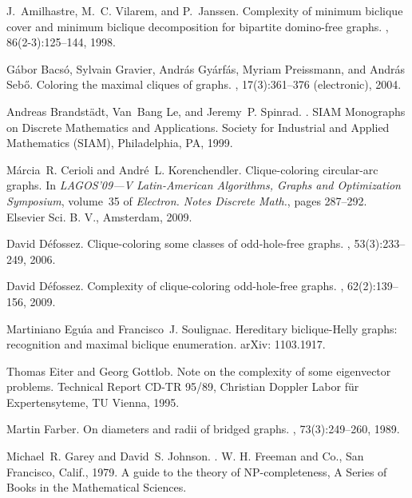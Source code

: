 \documentclass[a4paper, 11pt, oneside]{article}
\begin{document}
\begin{thebibliography}{10}

J.~Amilhastre, M.~C. Vilarem, and P.~Janssen.
\newblock Complexity of minimum biclique cover and minimum biclique
  decomposition for bipartite domino-free graphs.
, 86(2-3):125--144, 1998.

G{\'a}bor Bacs{\'o}, Sylvain Gravier, Andr{\'a}s Gy{\'a}rf{\'a}s, Myriam
  Preissmann, and Andr{\'a}s Seb{\H{o}}.
\newblock Coloring the maximal cliques of graphs.
, 17(3):361--376 (electronic), 2004.

Andreas Brandst{\"a}dt, Van~Bang Le, and Jeremy~P. Spinrad.
.
\newblock SIAM Monographs on Discrete Mathematics and Applications. Society for
  Industrial and Applied Mathematics (SIAM), Philadelphia, PA, 1999.

M{\'a}rcia~R. Cerioli and Andr{\'e}~L. Korenchendler.
\newblock Clique-coloring circular-arc graphs.
\newblock In {\em L{AGOS}'09---{V} {L}atin-{A}merican {A}lgorithms, {G}raphs
  and {O}ptimization {S}ymposium}, volume~35 of {\em Electron. Notes Discrete
  Math.}, pages 287--292. Elsevier Sci. B. V., Amsterdam, 2009.

David D{\'e}fossez.
\newblock Clique-coloring some classes of odd-hole-free graphs.
, 53(3):233--249, 2006.

David D{\'e}fossez.
\newblock Complexity of clique-coloring odd-hole-free graphs.
, 62(2):139--156, 2009.

Martiniano Egu\'{\i}a and Francisco~J. Soulignac.
\newblock Hereditary biclique-{H}elly graphs: recognition and maximal biclique
  enumeration.
\newblock arXiv: 1103.1917.

Thomas Eiter and Georg Gottlob.
\newblock Note on the complexity of some eigenvector problems.
\newblock Technical Report CD-TR 95/89, Christian Doppler Labor f\"ur
  Expertensyteme, TU Vienna, 1995.

Martin Farber.
\newblock On diameters and radii of bridged graphs.
, 73(3):249--260, 1989.

Michael~R. Garey and David~S. Johnson.
.
\newblock W. H. Freeman and Co., San Francisco, Calif., 1979.
\newblock A guide to the theory of NP-completeness, A Series of Books in the
  Mathematical Sciences.


\end{thebibliography}
\end{document}
